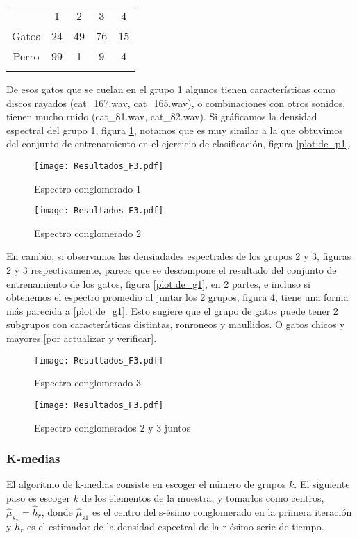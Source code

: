 \documentclass[twocolumn,10pt]{asme2ej}
\begin{document}
\begin{tabular}{ccccc}
 & 1 & 2 & 3 & 4\\
 Gatos & 24& 49 & 76 & 15\\
Perro & 99 & 1 & 9 & 4\\
\label{tbl:swap_set1}
\end{tabular}

De esos gatos que se cuelan en el grupo 1 algunos tienen caracter\'isticas como discos rayados (cat\_167.wav, cat\_165.wav), o combinaciones con otros sonidos, tienen mucho ruido (cat\_81.wav, cat\_82.wav). Si gr\'aficamos la densidad espectral del grupo 1, figura \ref{plot:espec_11}, notamos que es muy similar a la que obtuvimos del conjunto de entrenamiento en el ejercicio de clasificaci\'on, figura \ref{plot:de_p1}. \\

\begin{figure}[h]
  \centering
    \texttt{[image: Resultados\_F3.pdf]}
  \caption{Espectro conglomerado 1}
  \label{plot:espec_11}
\end{figure}
\begin{figure}[h]
  \centering
    \texttt{[image: Resultados\_F3.pdf]}
  \caption{Espectro conglomerado 2}
  \label{plot:espec_12}
\end{figure}
En cambio, si observamos las densiadades espectrales de los grupos 2 y 3, figuras \ref{plot:espec_12} y \ref{plot:espec_13} respectivamente, parece que se descompone el resultado del conjunto de entrenamiento de los gatos, figura \ref{plot:de_g1}, en 2 partes, e incluso si obtenemos el espectro promedio al juntar los 2 grupos, figura \ref{plot:espec_123}, tiene una forma m\'as parecida a \ref{plot:de_g1}. Esto sugiere que el grupo de gatos puede tener 2 subgrupos con caracter\'isticas distintas, ronroneos y maullidos. O gatos chicos y mayores.[por actualizar y verificar].
\begin{figure}[h]
  \centering
    \texttt{[image: Resultados\_F3.pdf]}
  \caption{Espectro conglomerado 3}
  \label{plot:espec_13}
\end{figure}
\begin{figure}[h]
  \centering
    \texttt{[image: Resultados\_F3.pdf]}
  \caption{Espectro conglomerados 2 y 3 juntos}
  \label{plot:espec_123}
\end{figure}
\subsubsection*{K-medias} %
\label{ssub:k_medias}
El algoritmo de k-medias consiste en escoger el n\'umero de grupos $k$. El siguiente paso es escoger $k$ de los elementos de la muestra, y tomarlos como centros, $\hat{\mu}_{s1}=\hat{h}_r$, donde $\hat{\mu}_{s1}$ es el centro del s-\'esimo conglomerado en la primera iteraci\'on y $\hat{h}_r$ es el estimador de la densidad espectral de la r-\'esimo serie de tiempo.\\
\end{document}
